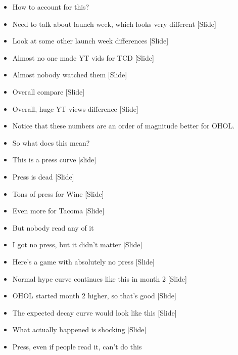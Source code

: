 \documentclass[12pt]{article}
\begin{document}
{\begin{itemize}
\item How to account for this?

\item Need to talk about launch week, which looks very different [Slide]

\item Look at some other launch week differences [Slide]

\item Almost no one made YT vids for TCD [Slide]

\item Almost nobody watched them [Slide]

\item Overall compare [Slide]

\item Overall, huge YT views difference [Slide]

\item Notice that these numbers are an order of magnitude better for OHOL.

\item So what does this mean?

\item This is a press curve [slide]

\item Press is dead [Slide]

\item Tons of press for Wine [Slide]

\item Even more for Tacoma [Slide]

\item But nobody read any of it

\item I got no press, but it didn't matter [Slide]

\item Here's a game with absolutely no press [Slide]

\item Normal hype curve continues like this in month 2 [Slide]

\item OHOL started month 2 higher, so that's good [Slide]

\item The expected decay curve would look like this [Slide]

\item What actually happened is shocking [Slide]

\item Press, even if people read it, can't do this


\end{itemize}}
\end{document}
